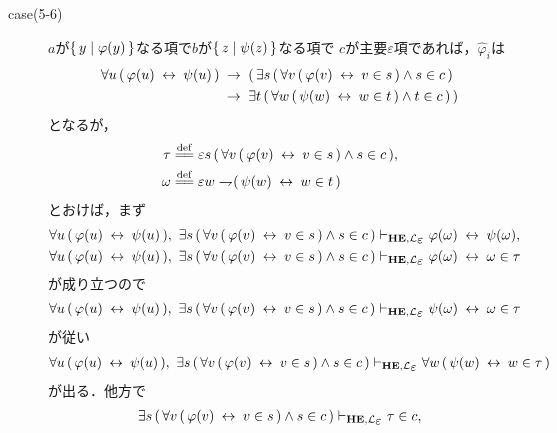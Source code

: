 \begin{metaprf}
\begin{description}
\begin{description}
					\item[case(5-6)] $a$が$\{\, y \mid \varphi(y)\, \}$なる項で$b$が$\{\, z \mid \psi(z)\, \}$なる項で
						$c$が主要$\varepsilon$項であれば，$\widehat{\varphi}_{i}$は
						\begin{align}
							\forall u\, (\, \varphi(u) \hspace{0.25em}\leftrightarrow\hspace{0.25em} \psi(u)\, ) 
							&\hspace{0.25em}\rightarrow\hspace{0.25em} (\, \exists s\, (\, \forall v\, (\, \varphi(v) \hspace{0.25em}\leftrightarrow\hspace{0.25em} v \in s\, ) \wedge s \in c\, ) \\
							&\hspace{0.25em}\rightarrow\hspace{0.25em} \exists t\, (\, \forall w\, (\, \psi(w) \hspace{0.25em}\leftrightarrow\hspace{0.25em} w \in t\, ) \wedge t \in c\, )\, )
						\end{align}
						となるが，
						\begin{align}
							\tau &\defeq \varepsilon s\, (\, \forall v\, (\, \varphi(v) \lrarrow v \in s\, ) \wedge s \in c\, ), \\
							\omega &\defeq \varepsilon w \negation (\, \psi(w) \lrarrow w \in t\, )
						\end{align}
						とおけば，まず
						\begin{align}
							\forall u\, (\, \varphi(u) \lrarrow \psi(u)\, ),\ 
							\exists s\, (\, \forall v\, (\, \varphi(v) \lrarrow v \in s\, ) \wedge s \in c\, )
							&\provable{\mbox{{\bf HE}},\lang{\varepsilon}} \varphi(\omega) \lrarrow \psi(\omega), \\
							\forall u\, (\, \varphi(u) \lrarrow \psi(u)\, ),\ 
							\exists s\, (\, \forall v\, (\, \varphi(v) \lrarrow v \in s\, ) \wedge s \in c\, )
							&\provable{\mbox{{\bf HE}},\lang{\varepsilon}} \varphi(\omega) \lrarrow \omega \in \tau
						\end{align}
						が成り立つので
						\begin{align}
							\forall u\, (\, \varphi(u) \lrarrow \psi(u)\, ),\ 
							\exists s\, (\, \forall v\, (\, \varphi(v) \lrarrow v \in s\, ) \wedge s \in c\, )
							\provable{\mbox{{\bf HE}},\lang{\varepsilon}} \psi(\omega) \lrarrow \omega \in \tau
						\end{align}
						が従い
						\begin{align}
							\forall u\, (\, \varphi(u) \lrarrow \psi(u)\, ),\ 
							\exists s\, (\, \forall v\, (\, \varphi(v) \lrarrow v \in s\, ) \wedge s \in c\, )
							\provable{\mbox{{\bf HE}},\lang{\varepsilon}} \forall w\, (\, \psi(w) \lrarrow w \in \tau\, )
						\end{align}
						が出る．他方で
						\begin{align}
							\exists s\, (\, \forall v\, (\, \varphi(v) \lrarrow v \in s\, ) \wedge s \in c\, )
							\provable{\mbox{{\bf HE}},\lang{\varepsilon}} \tau \in c, \\

\end{align}
\end{description}
\end{description}
\end{metaprf}
